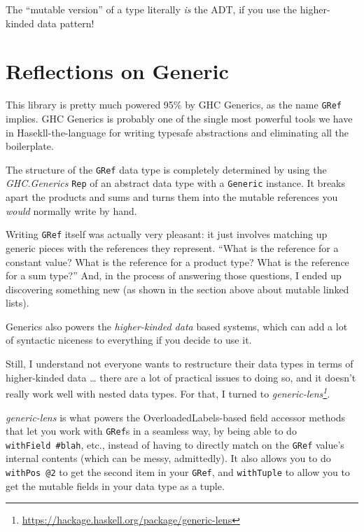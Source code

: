 \documentclass[]{article}
\renewcommand{\href}[2]{#2\footnote{\url{#1}}}
\begin{document}
The ``mutable version'' of a type literally \emph{is} the ADT, if you use the
higher-kinded data pattern!

\hypertarget{reflections-on-generic}{%
\section{Reflections on Generic}\label{reflections-on-generic}}

This library is pretty much powered 95\% by GHC Generics, as the name
\texttt{GRef} implies. GHC Generics is probably one of the single most powerful
tools we have in Hasekll-the-language for writing typesafe abstractions and
eliminating all the boilerplate.

The structure of the \texttt{GRef} data type is completely determined by using
the \emph{GHC.Generics} \texttt{Rep} of an abstract data type with a
\texttt{Generic} instance. It breaks apart the products and sums and turns them
into the mutable references you \emph{would} normally write by hand.

Writing \texttt{GRef} itself was actually very pleasant: it just involves
matching up generic pieces with the references they represent. ``What is the
reference for a constant value? What is the reference for a product type? What
is the reference for a sum type?'' And, in the process of answering those
questions, I ended up discovering something new (as shown in the section above
about mutable linked lists).

Generics also powers the \emph{higher-kinded data} based systems, which can add
a lot of syntactic niceness to everything if you decide to use it.

Still, I understand not everyone wants to restructure their data types in terms
of higher-kinded data \ldots{} there are a lot of practical issues to doing so,
and it doesn't really work well with nested data types. For that, I turned to
\emph{\href{https://hackage.haskell.org/package/generic-lens}{generic-lens}}.

\emph{generic-lens} is what powers the OverloadedLabels-based field accessor
methods that let you work with \texttt{GRef}s in a seamless way, by being able
to do \texttt{withField\ \#blah}, etc., instead of having to directly match on
the \texttt{GRef} value's internal contents (which can be messy, admittedly). It
also allows you to do \texttt{withPos\ @2} to get the second item in your
\texttt{GRef}, and \texttt{withTuple} to allow you to get the mutable fields in
your data type as a tuple.
\end{document}
